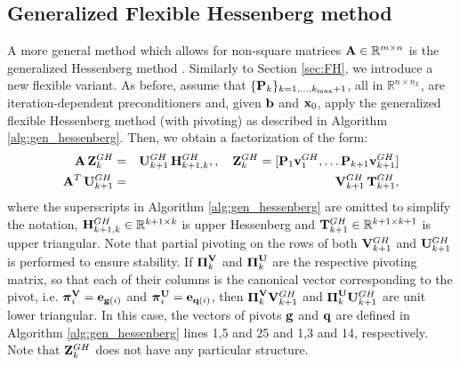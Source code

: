 \documentclass[11pt]{article}
\numberwithin{equation}{section}
\newcommand{\bfPi}{{\boldsymbol{\Pi}}}
\newcommand{\bfpi}{{\boldsymbol{\pi}}}
\newcommand{\bfA}{{\bf A}}
\newcommand{\bfH}{{\bf H}}
\newcommand{\bfP}{{\bf P}}
\newcommand{\bfT}{{\bf T}}
\newcommand{\bfU}{{\bf U}}
\newcommand{\bfV}{{\bf V}}
\newcommand{\bfZ}{{\bf Z}}
\newcommand{\bfb}{{\bf b}}
\newcommand{\bfe}{{\bf e}}
\newcommand{\bfg}{{\bf g}}
\newcommand{\bfq}{{\bf q}}
\newcommand{\bfv}{{\bf v}}
\newcommand{\bfx}{{\bf x}}
\begin{document}
\subsection{Generalized Flexible Hessenberg method}
A more general method which allows for non-square matrices $\bfA\in\mathbb{R}^{m\times n}$ is the generalized Hessenberg method \cite{brown2025hlslu}. Similarly to Section \ref{sec:FH}, we introduce a new flexible variant. As before, assume that $\{\bfP_{k}\}_{k=1,\dots,k_{\max}+1}$, all in  $\mathbb{R}^{n \times n_L}$, are iteration-dependent preconditioners and, given $\bfb$ and $\bfx_0$, apply the generalized flexible Hessenberg method (with pivoting) as described in Algorithm \ref{alg:gen_hessenberg}. Then, we obtain a factorization of the form:
\begin{eqnarray}\label{eq:Gen_Hessenberg_factorization}
    \bfA \, \bfZ^{GH}_{k} &=& \bfU^{GH}_{k+1}  \, \bfH^{GH}_{k+1,k}, , \quad \bfZ^{GH}_{k} = [\bfP_1 \bfv^{GH}_1,\dots \bfP_{k+1}\bfv^{GH}_{k+1}]  \nonumber \\
    \bfA^{T} \, \bfU^{GH}_{k+1} &=& \bfV^{GH}_{k+1}  \, \bfT^{GH}_{k+1},
\end{eqnarray}
where the superscripts in Algorithm \ref{alg:gen_hessenberg} are omitted to simplify the notation, $\bfH^{GH}_{k+1,k} \in \mathbb{R}^{k+1 \times k}$ is upper Hessenberg and $\bfT^{GH}_{k+1}\in \mathbb{R}^{k+1 \times k+1}$ is upper triangular. Note that partial pivoting on the rows of both $\bfV^{GH}_{k+1}$ and $\bfU^{GH}_{k+1}$ is performed to ensure  stability.  If $\bfPi^{\bfV}_k$ and  $\bfPi^{\bfU}_k$ are the respective pivoting matrix, so that each of their columns is the canonical vector corresponding to the pivot, i.e. $\bfpi^{\bfV}_i=\bfe_{\bfg(i)}$ and $\bfpi^{\bfU}_i=\bfe_{\bfq(i)}$, then $\bfPi^{\bfV}_k \bfV^{GH}_{k+1}$ and $\bfPi^{\bfU}_k \bfU^{GH}_{k+1}$ are unit lower triangular. In this case, the vectors of pivots $\bfg$ and $\bfq$ are defined in Algorithm \ref{alg:gen_hessenberg} lines 1,5 and 25 and 1,3 and 14, respectively. Note that $\bfZ^{GH}_{k}$ does not have any particular structure.
\end{document}
